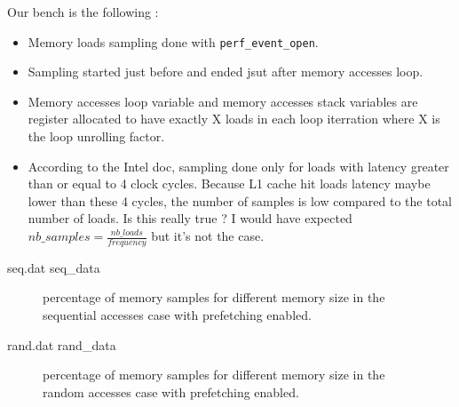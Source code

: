 \documentclass[10pt,a4paper]{article}
\begin{document}
Our bench is the following :
\begin{itemize}
\item Memory loads sampling done with \texttt{perf\_event\_open}.
\item  Sampling  started  just  before and  ended  jsut  after  memory
  accesses loop.
\item  Memory  accesses  loop   variable  and  memory  accesses  stack
  variables are  register allocated  to have exactly  X loads  in each
  loop iterration where X is the loop unrolling factor.
\item According  to the Intel doc,  sampling done only for  loads with
  latency greater  than or equal to  4 clock cycles. Because  L1 cache
  hit loads  latency maybe lower  than these  4 cycles, the  number of
  samples is low compared to the total number of loads. Is this really
  true    ?      I    would     have    expected     $nb\_samples    =
  \frac{nb\_loads}{frequency}$ but it's not the case.
\end{itemize}

\begin{filecontents}{seq.dat}
seq_data
\end{filecontents}

\begin{figure}[h]
  \caption{percentage of memory samples for different memory size in the sequential
    accesses case with prefetching enabled.}
\end{figure}

\begin{filecontents}{rand.dat}
rand_data
\end{filecontents}

\begin{figure}[h]
  \caption{percentage of memory samples for different memory size in the random
    accesses case with prefetching enabled.}
\end{figure}
\end{document}
